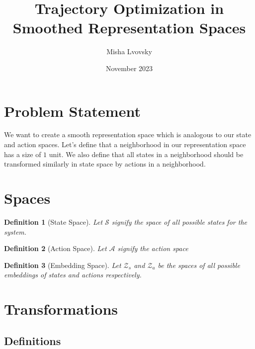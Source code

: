 \documentclass{article}
\title{Trajectory Optimization in Smoothed Representation Spaces}
\author{Misha Lvovsky}
\date{November 2023}
\newtheorem{definition}{Definition}
\begin{document}
\maketitle

\section{Problem Statement}

We want to create a smooth representation space which is analogous to our state and action spaces.
Let's define that a neighborhood in our representation space has a size of \(1\) unit.
We also define that all states in a neighborhood should be transformed similarly in state space by actions in a neighborhood.

\section{Spaces}

\begin{definition} [State Space]
Let $\mathcal{S}$ signify the space of all possible states for the system.
\end{definition}
\begin{definition} [Action Space]
Let $\mathcal{A}$ signify the action space
\end{definition}
\begin{definition} [Embedding Space]
Let $\mathcal{Z}_s$ and $\mathcal{Z}_a$ be the spaces of all possible embeddings of states and actions respectively.
\end{definition}

\section{Transformations}

\subsection*{Definitions}
\end{document}
